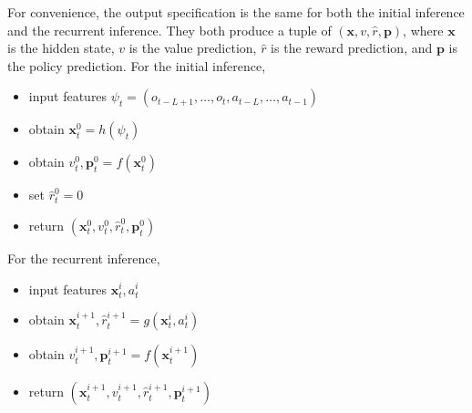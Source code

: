For convenience, the output specification is the same for both the initial inference and the recurrent inference.
They both produce a tuple of $(\mathbf{x}, v, \hat{r}, \mathbf{p})$, where $\mathbf{x}$ is the hidden state, $v$ is the value prediction, $\hat{r}$ is the reward prediction, and $\mathbf{p}$ is the policy prediction.
For the initial inference,
\begin{itemize}
    \item input features $\psi_t = (o_{t - L + 1}, \dots, o_t, a_{t - L}, \dots, a_{t -1})$
    \item obtain $\mathbf{x}_t^0 = h(\psi_t)$
    \item obtain $v^0_t, \mathbf{p}^0_t = f(\mathbf{x}_t^0)$
    \item set $\hat{r}_t^0 = 0$
    \item return $(\mathbf{x}^0_t, v_t^0, \hat{r}_t^0, \mathbf{p}^0_t)$
\end{itemize}
For the recurrent inference,
\begin{itemize}
    \item input features $\mathbf{x}_t^i, a_t^i$
    \item obtain $\mathbf{x}_t^{i+1}, \hat{r}_t^{i+1} = g(\mathbf{x}_t^i, a_t^i)$
    \item obtain $v^{i+1}_t, \mathbf{p}^{i+1}_t = f(\mathbf{x}_t^{i+1})$
    \item return $(\mathbf{x}^{i+1}_t, v_t^{i+1}, \hat{r}_t^{i+1}, \mathbf{p}^{i+1}_t)$
\end{itemize}


